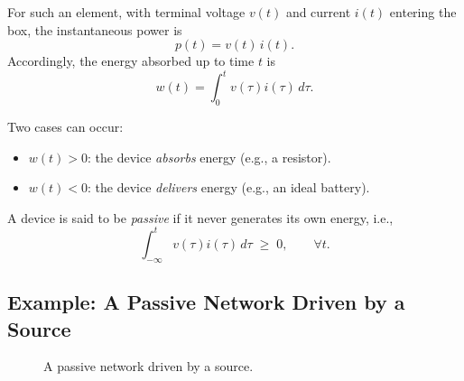 For such an element, with terminal voltage $v(t)$ and current $i(t)$ entering the box, 
the instantaneous power is
\begin{equation}
    p(t) = v(t)\, i(t).
\end{equation}
Accordingly, the energy absorbed up to time $t$ is
\begin{equation}
    w(t) = \int_{0}^{t} v(\tau) i(\tau)\, d\tau.
\end{equation}

\noindent Two cases can occur:
\begin{itemize}
    \item $w(t) > 0$: the device \emph{absorbs} energy (e.g., a resistor).
    \item $w(t) < 0$: the device \emph{delivers} energy (e.g., an ideal battery).
\end{itemize}

\begin{definition}
A device is said to be \emph{passive} if it never generates its own energy, i.e.,
\begin{equation}
    \int_{-\infty}^{t} v(\tau) i(\tau)\, d\tau \;\geq\; 0,
    \qquad \forall t.
\end{equation}
\end{definition}

\subsection{Example: A Passive Network Driven by a Source}

\begin{figure}[h!]
    \centering
    \caption{A passive network driven by a source.}
    \label{fig:passive_network}
\end{figure}


